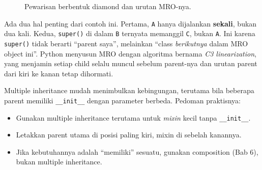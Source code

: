 \begin{figure}[htbp]
\centering
{}
\caption{Pewarisan berbentuk diamond dan urutan MRO-nya.}
\end{figure}

Ada dua hal penting dari contoh ini. Pertama, \texttt{A} hanya dijalankan \textbf{sekali}, bukan dua kali. Kedua, \texttt{super()} di dalam \texttt{B} ternyata memanggil \texttt{C}, bukan \texttt{A}. Ini karena \texttt{super()} tidak berarti ``parent saya'', melainkan ``class \emph{berikutnya} dalam MRO object ini''. Python menyusun MRO dengan algoritma bernama \emph{C3 linearization}, yang menjamin setiap child selalu muncul sebelum parent-nya dan urutan parent dari kiri ke kanan tetap dihormati.

\begin{penting}
Multiple inheritance mudah menimbulkan kebingungan, terutama bila beberapa parent memiliki \texttt{\_\_init\_\_} dengan parameter berbeda. Pedoman praktisnya:
\begin{itemize}
  \item Gunakan multiple inheritance terutama untuk \emph{mixin} kecil tanpa \texttt{\_\_init\_\_}.
  \item Letakkan parent utama di posisi paling kiri, mixin di sebelah kanannya.
  \item Jika kebutuhannya adalah ``memiliki'' sesuatu, gunakan composition (Bab 6), bukan multiple inheritance.
\end{itemize}
\end{penting}

